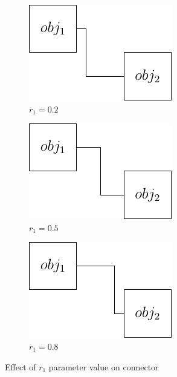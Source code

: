 \documentclass[a4paper,12pt]{report}
\begin{document}
\begin{figure}
  \centering
  \begin{subfigure}{.33\textwidth}
    \centering
    \includegraphics[width=0.9\linewidth]{connectorExample_r1_0_2.pdf}
    \caption{$r_1=0.2$}
    \label{fig:sfig1}
  \end{subfigure}\hfill
  \begin{subfigure}{.33\textwidth}
    \centering
    \includegraphics[width=0.9\linewidth]{connectorExample_r1_0_5.pdf}
    \caption{$r_1=0.5$}
    \label{fig:sfig2}
  \end{subfigure}\hfill
  \begin{subfigure}{.33\textwidth}
    \centering
    \includegraphics[width=0.9\linewidth]{connectorExample_r1_0_8.pdf}
    \caption{$r_1=0.8$}
    \label{fig:sfig3}
  \end{subfigure}

  \caption{Effect of $r_1$ parameter value on connector}
  \label{r1_connectorExample}
\end{figure}
\end{document}
